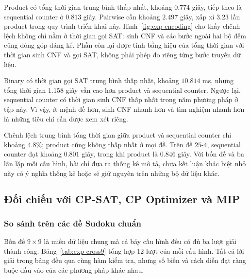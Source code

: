 \documentclass[a4paper,fleqn]{cas-sc}
\begin{document}
Product có tổng thời gian trung bình thấp nhất, khoảng $0.774$ giây,
tiếp theo là sequential counter ở $0.813$ giây. Pairwise cần khoảng
$2.497$ giây, xấp xỉ $3.23$ lần product trong quy trình triển khai này.
Hình~\ref{fig:exp-encoding} cho thấy chênh lệch không chỉ nằm ở thời
gian gọi SAT: sinh CNF và các bước ngoài hai bộ đếm cũng đóng góp đáng
kể. Phần còn lại được tính bằng hiệu của tổng thời gian với thời gian
sinh CNF và gọi SAT, không phải phép đo riêng từng bước truyền dữ liệu.

Binary có thời gian gọi SAT trung bình thấp nhất, khoảng $10.814$ ms,
nhưng tổng thời gian $1.158$ giây vẫn cao hơn product và sequential
counter. Ngược lại, sequential counter có thời gian sinh CNF thấp nhất
trong năm phương pháp ở tập này. Vì vậy, ít mệnh đề hơn, sinh CNF nhanh
hơn và tìm nghiệm nhanh hơn là những tiêu chí cần được xem xét riêng.

Chênh lệch trung bình tổng thời gian giữa product và sequential counter
chỉ khoảng $4.8\%$; product cũng không thấp nhất ở mọi đề. Trên đề
$25$-$4$, sequential counter đạt khoảng $0.801$ giây, trong khi product
là $0.846$ giây. Với bốn đề và ba lần lặp mỗi cấu hình, bài chỉ đưa ra
thống kê mô tả, chưa kết luận khác biệt nhỏ này có ý nghĩa thống kê
hoặc sẽ giữ nguyên trên những bộ dữ liệu khác.

\subsection{Đối chiếu với CP-SAT, CP Optimizer và MIP}

\subsubsection{So sánh trên các đề Sudoku chuẩn}

Bốn đề $9\times9$ là miền dữ liệu chung mà cả bảy cấu hình đều có
đủ ba lượt giải thành công. Bảng~\ref{tab:exp-cross9} tổng hợp $12$
lượt của mỗi cấu hình. Tất cả lời giải trong bảng đều qua cùng hàm
kiểm tra, nhưng số biến và cách diễn đạt ràng buộc đầu vào của các
phương pháp khác nhau.
\end{document}

